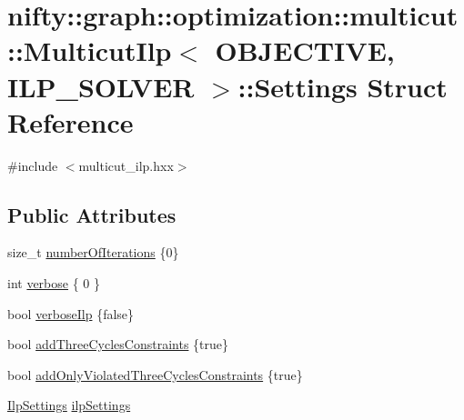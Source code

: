 \hypertarget{structnifty_1_1graph_1_1optimization_1_1multicut_1_1MulticutIlp_1_1Settings}{}\section{nifty\+:\+:graph\+:\+:optimization\+:\+:multicut\+:\+:Multicut\+Ilp$<$ O\+B\+J\+E\+C\+T\+I\+V\+E, I\+L\+P\+\_\+\+S\+O\+L\+V\+E\+R $>$\+:\+:Settings Struct Reference}
\label{structnifty_1_1graph_1_1optimization_1_1multicut_1_1MulticutIlp_1_1Settings}


{\ttfamily \#include $<$multicut\+\_\+ilp.\+hxx$>$}

\subsection*{Public Attributes}
\begin{DoxyCompactItemize}
\item 
size\+\_\+t \hyperlink{structnifty_1_1graph_1_1optimization_1_1multicut_1_1MulticutIlp_1_1Settings_ac37aac341de41979b346f0f32c7004df}{number\+Of\+Iterations} \{0\}
\item 
int \hyperlink{structnifty_1_1graph_1_1optimization_1_1multicut_1_1MulticutIlp_1_1Settings_aca38bc8e85af963ac71147b1abc171e2}{verbose} \{ 0 \}
\item 
bool \hyperlink{structnifty_1_1graph_1_1optimization_1_1multicut_1_1MulticutIlp_1_1Settings_a5261ee487cde7d6a6f37d8858aa1264a}{verbose\+Ilp} \{false\}
\item 
bool \hyperlink{structnifty_1_1graph_1_1optimization_1_1multicut_1_1MulticutIlp_1_1Settings_ac78600936333a727a0eb5d51a86b8ff8}{add\+Three\+Cycles\+Constraints} \{true\}
\item 
bool \hyperlink{structnifty_1_1graph_1_1optimization_1_1multicut_1_1MulticutIlp_1_1Settings_a33b22b5d6421488e25b34c7748dda9e2}{add\+Only\+Violated\+Three\+Cycles\+Constraints} \{true\}
\item 
\hyperlink{classnifty_1_1graph_1_1optimization_1_1multicut_1_1MulticutIlp_a61b515766e63459084d16525e62c527d}{Ilp\+Settings} \hyperlink{structnifty_1_1graph_1_1optimization_1_1multicut_1_1MulticutIlp_1_1Settings_aef7e419508dee6cf6897736166b17152}{ilp\+Settings}
\end{DoxyCompactItemize}



